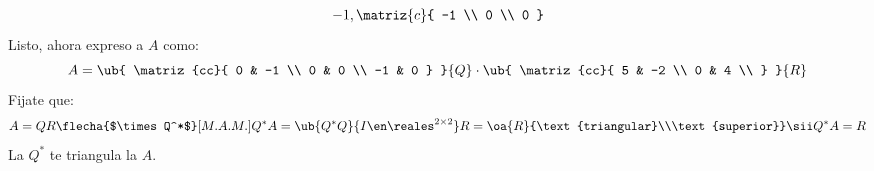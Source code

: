 \begin{enumerate}[label=\alph*)]
$$\begin{array}{rcl}
{{                -1
              }
              ,
              \matriz{c}{
            -1                                      \\
            0                                       \\
                0
              }
            }                                       \\
          \end{array}
        $$
        Listo, ahora expreso a $A$ como:
        $$
          A =
          \ub{
            \matriz{cc}{
              0 & -1  \\
              0 & 0  \\
              -1 & 0
            }
          }{Q}
          \cdot
          \ub{
            \matriz{cc}{
              5 & -2  \\
              0 & 4    \\
            }
          }{R}
        $$
        Fijate que:
        $$
          A = QR
          \flecha{$\times Q^*$}[M.A.M.]
          Q^*A = \ub{Q^*Q}{I \en \reales^{2 \times 2}} R =
          \oa{R}{\text{triangular}\\\text{superior}}
          \sii
          Q^* A = R
        $$
        La $Q^*$ te triangula la $A$.


\end{enumerate}
